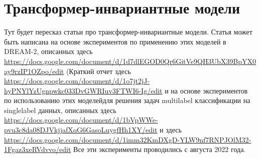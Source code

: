 \chapter{Трансформер-инвариантные модели}\label{ch:tr-ag}

Тут будет пересказ статьи про трансформер-инвариантные модели. 
Статья может быть написана на основе экспериментов по применению этих моделей в DREAM-2, описанных здесь 
\url{https://docs.google.com/document/d/1d7dlEGOD0Qr6GitVe9QH3UbX39BpYX0ay9rzIP1OZpo/edit}
(Краткий отчет здесь \url{https://docs.google.com/document/d/1o7jt2jJ-hyPNYlYzUgnpwkc033DvGWRIuv3FTWI6-Ig/edit}
и на основе экспериментов по использованию этих моделейдля решения задач multilabel классификации на singlelabel данных, описанных здесь
\url{https://docs.google.com/document/d/1bVpWWe-pvu3c8da08DJVkjjafXqG6GasoLuygfHh1XY/edit}
и здесь 
\url{https://docs.google.com/document/d/1imm32KmDXgD-YLW9nf7RNPJOlM32-1Fgaz3xeRVdvvo/edit}
Все эти эксперименты проводились с августа 2022 года.
